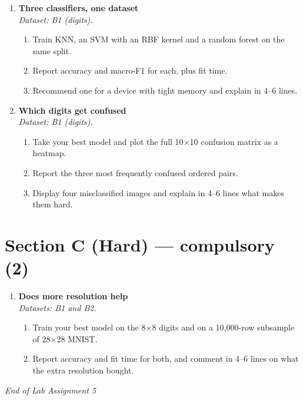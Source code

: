\documentclass[11pt,a4paper]{article}
\begin{document}
\begin{enumerate}[label=\textbf{B\arabic*.}, leftmargin=*]

  \item \textbf{Three classifiers, one dataset} \\
    \emph{Dataset: B1 (digits).}
    \begin{enumerate}[label=(\alph*), leftmargin=*]
      \item Train KNN, an SVM with an RBF kernel and a random forest on the same split.
      \item Report accuracy and macro-F1 for each, plus fit time.
      \item Recommend one for a device with tight memory and explain in 4--6 lines.
    \end{enumerate}

  \item \textbf{Which digits get confused} \\
    \emph{Dataset: B1 (digits).}
    \begin{enumerate}[label=(\alph*), leftmargin=*]
      \item Take your best model and plot the full 10$\times$10 confusion matrix as a heatmap.
      \item Report the three most frequently confused ordered pairs.
      \item Display four misclassified images and explain in 4--6 lines what makes them hard.
    \end{enumerate}

\end{enumerate}

\section*{Section C (Hard) --- compulsory \quad (2)}

\begin{enumerate}[label=\textbf{C\arabic*.}, leftmargin=*]

  \item \textbf{Does more resolution help} \\
    \emph{Datasets: B1 and B2.}
    \begin{enumerate}[label=(\alph*), leftmargin=*]
      \item Train your best model on the 8$\times$8 digits and on a 10{,}000-row subsample of 28$\times$28 MNIST.
      \item Report accuracy and fit time for both, and comment in 4--6 lines on what the extra resolution bought.
    \end{enumerate}

\end{enumerate}

\vfill\noindent\textit{End of Lab Assignment 5}

\notesources{\AMLLabSources}
\end{document}
